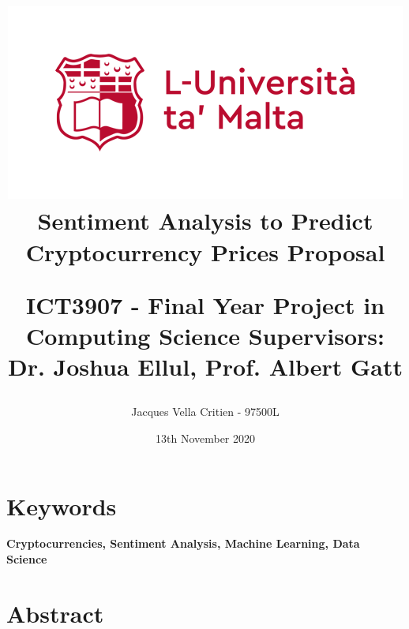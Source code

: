 \documentclass{article}
\begin{document}
	\title{\includegraphics[scale = .6]{uom.png}
	\linebreak 
	\textbf{Sentiment Analysis to Predict Cryptocurrency Prices}\linebreak\linebreak
	\textbf{Proposal}\linebreak\linebreak
	
	ICT3907 - Final Year Project in Computing Science  \linebreak
	Supervisors: Dr. Joshua Ellul, Prof. Albert Gatt\linebreak
	\date{13th November 2020}
	\author{Jacques Vella Critien - 97500L}}
				
	\begin{titlepage}
		\maketitle
		\thispagestyle{empty}
	\end{titlepage}
	
				
	\newpage
	
	\section{Keywords}
	
	\textbf{Cryptocurrencies, Sentiment Analysis, Machine Learning, Data Science}
	
	\section{Abstract}
	
\end{document}
